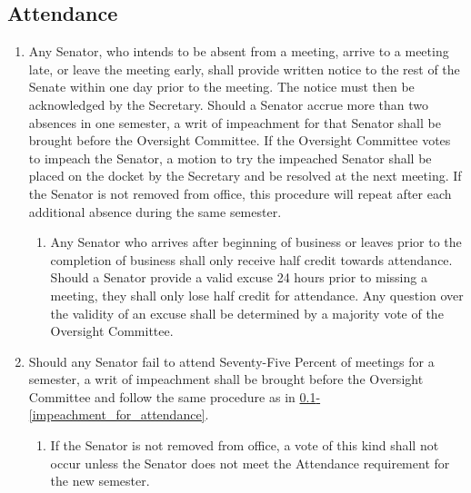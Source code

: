\documentclass[12pt]{scrreprt}
\begin{document}
\subsection{Attendance} \label{sec:meeting_attendance}
\begin{enumerate}
    \item \label{impeachment_for_attendance}Any Senator, who intends to be 
          absent from a meeting, arrive to a meeting late, or leave the 
          meeting early, shall provide written notice to the rest of the 
          Senate within one day prior to the meeting. The notice must then be 
          acknowledged by the Secretary. Should a Senator accrue more than 
          two absences in one semester, a writ of impeachment for that 
          Senator shall be brought before the Oversight Committee. If the 
          Oversight Committee votes to impeach the Senator, a motion to try 
          the impeached Senator shall be placed on the docket by the Secretary 
          and be resolved at the next meeting. If the Senator is not removed 
          from office, this procedure will repeat after each additional 
          absence during the same semester. 
        \begin{enumerate}
            \item Any Senator who arrives after beginning of business or 
                  leaves prior to the completion of business shall only 
                  receive half credit towards attendance. Should a Senator 
                  provide a valid excuse 24 hours prior to missing a
                  meeting, they shall only lose half credit for
                  attendance. Any question over the validity of an
                  excuse shall be determined by a majority vote of the
                  Oversight Committee.
        \end{enumerate}
    \item Should any Senator fail to attend Seventy-Five Percent of meetings 
          for a semester, a writ of impeachment shall be brought before the 
          Oversight Committee and follow the same procedure as in 
          \hyperref[impeachment_for_attendance]{\ref*{sec:meeting_attendance}-\ref*{impeachment_for_attendance}}. 
        \begin{enumerate}
            \item If the Senator is not removed from office, a vote of this 
                  kind shall not occur unless the Senator does not meet the 
                  Attendance requirement for the new semester. 
        \end{enumerate}
\end{enumerate}
\end{document}
